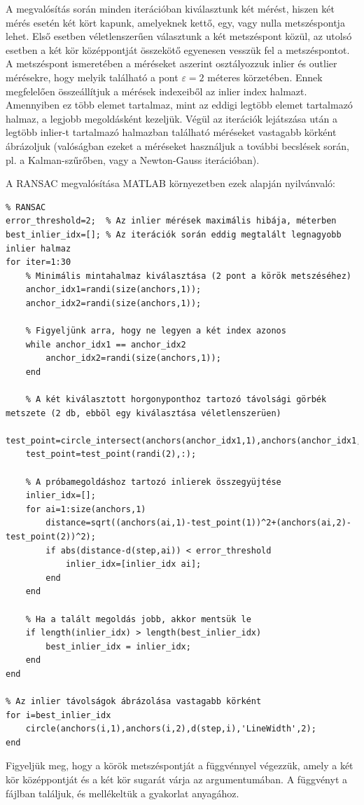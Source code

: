 \begin{answer}
	A megvalósítás során minden iterációban kiválasztunk két mérést, hiszen két mérés esetén két kört kapunk, amelyeknek kettő, egy, vagy nulla metszéspontja lehet. Első esetben véletlenszerűen választunk a két metszéspont közül, az utolsó esetben a két kör középpontját összekötő egyenesen vesszük fel a metszéspontot. A metszéspont ismeretében a méréseket aszerint osztályozzuk inlier és outlier mérésekre, hogy melyik található a pont $\varepsilon=2$ méteres körzetében. Ennek megfelelően összeállítjuk a mérések indexeiből az inlier index halmazt. Amennyiben ez több elemet tartalmaz, mint az eddigi legtöbb elemet tartalmazó halmaz, a legjobb megoldásként kezeljük. Végül az iterációk lejátszása után a legtöbb inlier-t tartalmazó halmazban található méréseket vastagabb körként ábrázoljuk (valóságban ezeket a méréseket használjuk a további becslések során, pl. a Kalman-szűrőben, vagy a Newton-Gauss iterációban).
	
	A RANSAC megvalósítása MATLAB környezetben ezek alapján nyilvánvaló:
	\begin{lstlisting}
% RANSAC
error_threshold=2;	% Az inlier mérések maximális hibája, méterben
best_inlier_idx=[];	% Az iterációk során eddig megtalált legnagyobb inlier halmaz
for iter=1:30
	% Minimális mintahalmaz kiválasztása (2 pont a körök metszéséhez)
	anchor_idx1=randi(size(anchors,1));
	anchor_idx2=randi(size(anchors,1));
	
	% Figyeljünk arra, hogy ne legyen a két index azonos
	while anchor_idx1 == anchor_idx2
		anchor_idx2=randi(size(anchors,1));
	end
	
	% A két kiválasztott horgonyponthoz tartozó távolsági görbék metszete (2 db, ebböl egy kiválasztása véletlenszerüen)
	test_point=circle_intersect(anchors(anchor_idx1,1),anchors(anchor_idx1,2),d(step,anchor_idx1),anchors(anchor_idx2,1),anchors(anchor_idx2,2),d(step,anchor_idx2));
	test_point=test_point(randi(2),:);
	
	% A próbamegoldáshoz tartozó inlierek összegyüjtése
	inlier_idx=[];
	for ai=1:size(anchors,1)
		distance=sqrt((anchors(ai,1)-test_point(1))^2+(anchors(ai,2)-test_point(2))^2);
		if abs(distance-d(step,ai)) < error_threshold
			inlier_idx=[inlier_idx ai];
		end
	end
	
	% Ha a talált megoldás jobb, akkor mentsük le
	if length(inlier_idx) > length(best_inlier_idx)
		best_inlier_idx = inlier_idx;
	end
end
	
% Az inlier távolságok ábrázolása vastagabb körként
for i=best_inlier_idx
	circle(anchors(i,1),anchors(i,2),d(step,i),'LineWidth',2);
end
	\end{lstlisting}
	
	Figyeljük meg, hogy a körök metszéspontját a  függvénnyel végezzük, amely a két kör középpontját és a két kör sugarát várja az argumentumában. A függvényt a  fájlban találjuk, és mellékeltük a gyakorlat anyagához.
\end{answer}


